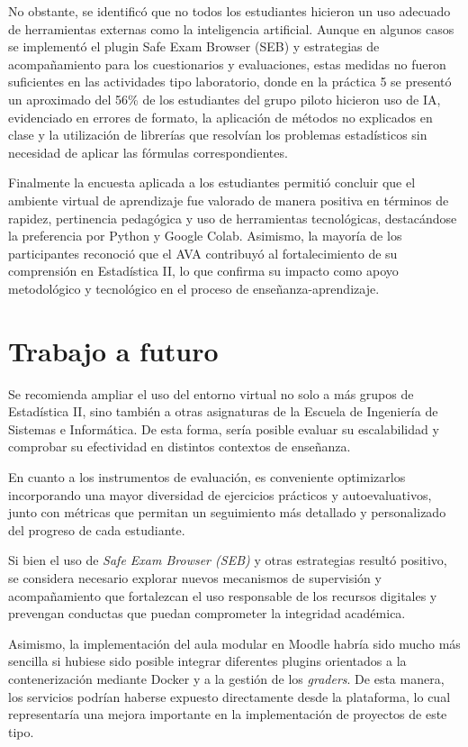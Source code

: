 \documentclass[letter,oneside,12pt,spanish]{report}
\begin{document}
No obstante, se identificó que no todos los estudiantes hicieron un uso adecuado de herramientas externas como la inteligencia artificial. Aunque en algunos casos se implementó el plugin Safe Exam Browser (SEB) y estrategias de acompañamiento para los cuestionarios y evaluaciones, estas medidas no fueron suficientes en las actividades tipo laboratorio, donde en la práctica 5 se presentó un aproximado del 56\% de los estudiantes del grupo piloto hicieron uso de IA, evidenciado en errores de formato, la aplicación de métodos no explicados en clase y la utilización de librerías que resolvían los problemas estadísticos sin necesidad de aplicar las fórmulas correspondientes.

Finalmente la encuesta aplicada a los estudiantes permitió concluir que el ambiente virtual de aprendizaje fue valorado de manera positiva en términos de rapidez, pertinencia pedagógica y uso de herramientas tecnológicas, destacándose la preferencia por Python y Google Colab. Asimismo, la mayoría de los participantes reconoció que el AVA contribuyó al fortalecimiento de su comprensión en Estadística II, lo que confirma su impacto como apoyo metodológico y tecnológico en el proceso de enseñanza-aprendizaje.

\section{Trabajo a futuro}

Se recomienda ampliar el uso del entorno virtual no solo a más grupos de Estadística II, sino también a otras asignaturas de la Escuela de Ingeniería de Sistemas e Informática. De esta forma, sería posible evaluar su escalabilidad y comprobar su efectividad en distintos contextos de enseñanza.

En cuanto a los instrumentos de evaluación, es conveniente optimizarlos incorporando una mayor diversidad de ejercicios prácticos y autoevaluativos, junto con métricas que permitan un seguimiento más detallado y personalizado del progreso de cada estudiante.

Si bien el uso de \textit{Safe Exam Browser (SEB)} y otras estrategias resultó positivo, se considera necesario explorar nuevos mecanismos de supervisión y acompañamiento que fortalezcan el uso responsable de los recursos digitales y prevengan conductas que puedan comprometer la integridad académica.

Asimismo, la implementación del aula modular en Moodle habría sido mucho más sencilla si hubiese sido posible integrar diferentes plugins orientados a la contenerización mediante Docker y a la gestión de los \textit{graders}. De esta manera, los servicios podrían haberse expuesto directamente desde la plataforma, lo cual representaría una mejora importante en la implementación de proyectos de este tipo.
\end{document}
